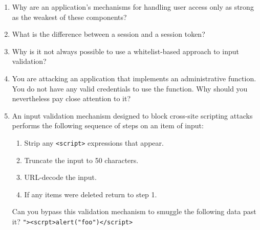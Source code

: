 \begin{enumerate}
    \item Why are an application's mechanisms for handling user access only as strong as the weakest of these components?
    \item What is the difference between a session and a session token?
    \item Why is it not always possible to use a whitelist-based approach to input validation?
    \item You are attacking an application that implements an administrative function. You do not have any valid credentials to use the function. Why should you nevertheless pay close attention to it?
    \item An input validation mechanism designed to block cross-site scripting attacks performs the following sequence of steps on an item of input: \begin{enumerate}
        \item Strip any \verb|<script>| expressions that appear.
        \item Truncate the input to 50 characters.
        \item URL-decode the input.
        \item If any items were deleted return to step 1.
    \end{enumerate}
    Can you bypass this validation mechanism to smuggle the following data past it?
    \verb|"><scrpt>alert("foo")</script>|
\end{enumerate}